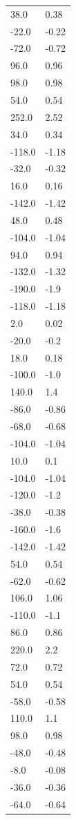 \begin{longtable}{ll}
38.0 & 0.38 \\
-22.0 & -0.22 \\
-72.0 & -0.72 \\
96.0 & 0.96 \\
98.0 & 0.98 \\
54.0 & 0.54 \\
252.0 & 2.52 \\
34.0 & 0.34 \\
-118.0 & -1.18 \\
-32.0 & -0.32 \\
16.0 & 0.16 \\
-142.0 & -1.42 \\
48.0 & 0.48 \\
-104.0 & -1.04 \\
94.0 & 0.94 \\
-132.0 & -1.32 \\
-190.0 & -1.9 \\
-118.0 & -1.18 \\
2.0 & 0.02 \\
-20.0 & -0.2 \\
18.0 & 0.18 \\
-100.0 & -1.0 \\
140.0 & 1.4 \\
-86.0 & -0.86 \\
-68.0 & -0.68 \\
-104.0 & -1.04 \\
10.0 & 0.1 \\
-104.0 & -1.04 \\
-120.0 & -1.2 \\
-38.0 & -0.38 \\
-160.0 & -1.6 \\
-142.0 & -1.42 \\
54.0 & 0.54 \\
-62.0 & -0.62 \\
106.0 & 1.06 \\
-110.0 & -1.1 \\
86.0 & 0.86 \\
220.0 & 2.2 \\
72.0 & 0.72 \\
54.0 & 0.54 \\
-58.0 & -0.58 \\
110.0 & 1.1 \\
98.0 & 0.98 \\
-48.0 & -0.48 \\
-8.0 & -0.08 \\
-36.0 & -0.36 \\
-64.0 & -0.64 \\

\end{longtable}
